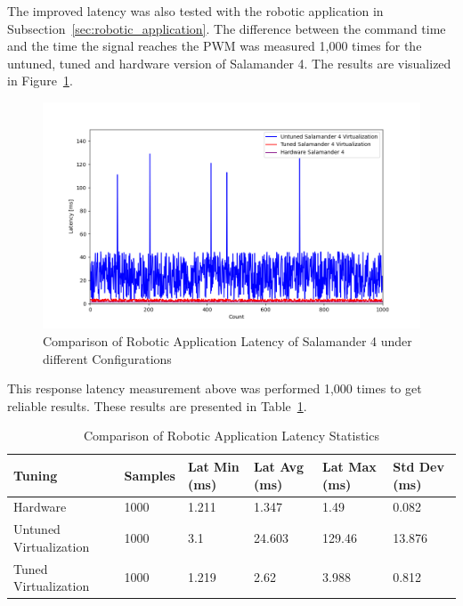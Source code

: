 \documentclass[MMR,Master,english]{twbook}
\begin{document}
\clearpage 

\noindent The improved latency was also tested with the robotic application in Subsection~\ref{sec:robotic_application}. The difference between the command time and the time the signal reaches the PWM was measured 1,000 times for the untuned, tuned and hardware version of Salamander 4. The results are visualized in Figure~\ref{fig:combined_latencies}. 

\begin{figure}[H]
	\centering
	\includegraphics[width=1.0\columnwidth]{masterthesis-documentation/docs/resources/scripts/experiment/generated_latencies/combined_latencies.png}
	\caption[Comparison of Robotic Application Latency of Salamander 4 Configurations]{Comparison of Robotic Application Latency of Salamander 4 under different Configurations}
	\label{fig:combined_latencies}
\end{figure}

\noindent This response latency measurement above was performed 1,000 times to get reliable results. These results are presented in Table~\ref{tab:robotic_application_latency_values_combined}.

\begin{table}[H]
	\small
	\centering
	\caption{Comparison of Robotic Application Latency Statistics}
	\label{tab:robotic_application_latency_values_combined}
	\setlength{\tabcolsep}{0.5em} %
	{\renewcommand{\arraystretch}{1.2}%
		\begin{tabular}{|l|l|l|l|l|l|}
			\hline
			\textbf{Tuning} & \textbf{Samples} & \textbf{Lat Min (ms)} & \textbf{Lat Avg (ms)} & \textbf{Lat Max (ms)} & \textbf{Std Dev (ms)} \\ \hline
			Hardware & 1000 & 1.211 & 1.347 & 1.49 & 0.082 \\ \hline
			Untuned Virtualization & 1000 & 3.1 & 24.603 & 129.46 & 13.876 \\ \hline
			Tuned Virtualization & 1000 & 1.219 & 2.62 & 3.988 & 0.812 \\ \hline
		\end{tabular}}
\end{table}
\end{document}
